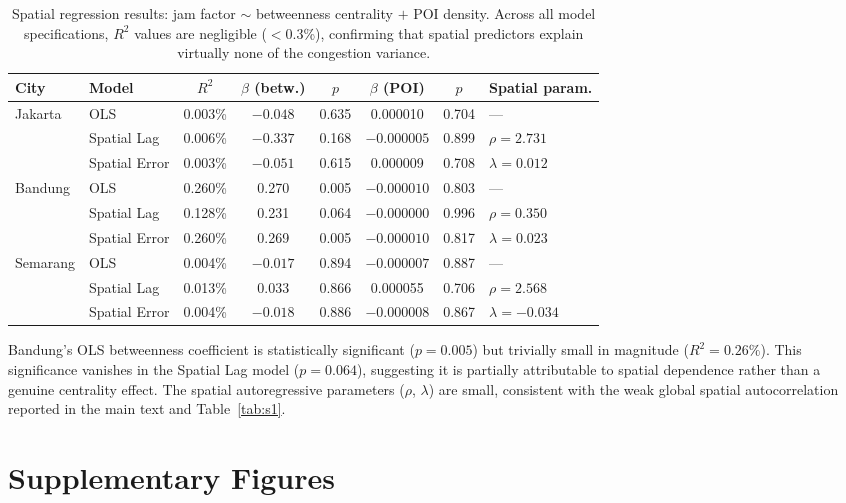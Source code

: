 \documentclass[preprint,12pt]{elsarticle}
\begin{document}
\begin{table}[!htbp]
\centering
\caption{Spatial regression results: jam factor $\sim$ betweenness centrality $+$ POI density. Across all model specifications, $R^2$ values are negligible ($<$0.3\%), confirming that spatial predictors explain virtually none of the congestion variance.}
\label{tab:s8}
\small
\begin{tabular}{llcccccl}
\toprule
City & Model & $R^2$ & $\beta$ (betw.) & $p$ & $\beta$ (POI) & $p$ & Spatial param. \\
\midrule
\multirow{3}{*}{Jakarta}
 & OLS           & 0.003\% & $-0.048$ & 0.635 & 0.000010  & 0.704 & ---              \\
 & Spatial Lag   & 0.006\% & $-0.337$ & 0.168 & $-0.000005$ & 0.899 & $\rho = 2.731$   \\
 & Spatial Error & 0.003\% & $-0.051$ & 0.615 & 0.000009  & 0.708 & $\lambda = 0.012$ \\
\midrule
\multirow{3}{*}{Bandung}
 & OLS           & 0.260\% & 0.270    & 0.005 & $-0.000010$ & 0.803 & ---              \\
 & Spatial Lag   & 0.128\% & 0.231    & 0.064 & $-0.000000$ & 0.996 & $\rho = 0.350$   \\
 & Spatial Error & 0.260\% & 0.269    & 0.005 & $-0.000010$ & 0.817 & $\lambda = 0.023$ \\
\midrule
\multirow{3}{*}{Semarang}
 & OLS           & 0.004\% & $-0.017$ & 0.894 & $-0.000007$ & 0.887 & ---              \\
 & Spatial Lag   & 0.013\% & 0.033    & 0.866 & 0.000055  & 0.706 & $\rho = 2.568$   \\
 & Spatial Error & 0.004\% & $-0.018$ & 0.886 & $-0.000008$ & 0.867 & $\lambda = -0.034$ \\
\bottomrule
\end{tabular}
\end{table}

Bandung's OLS betweenness coefficient is statistically significant ($p{=}0.005$) but trivially small in magnitude ($R^2 = 0.26\%$). This significance vanishes in the Spatial Lag model ($p{=}0.064$), suggesting it is partially attributable to spatial dependence rather than a genuine centrality effect. The spatial autoregressive parameters ($\rho$, $\lambda$) are small, consistent with the weak global spatial autocorrelation reported in the main text and Table~\ref{tab:s1}.

\section{Supplementary Figures}
\label{sec:sfigs}
\end{document}
